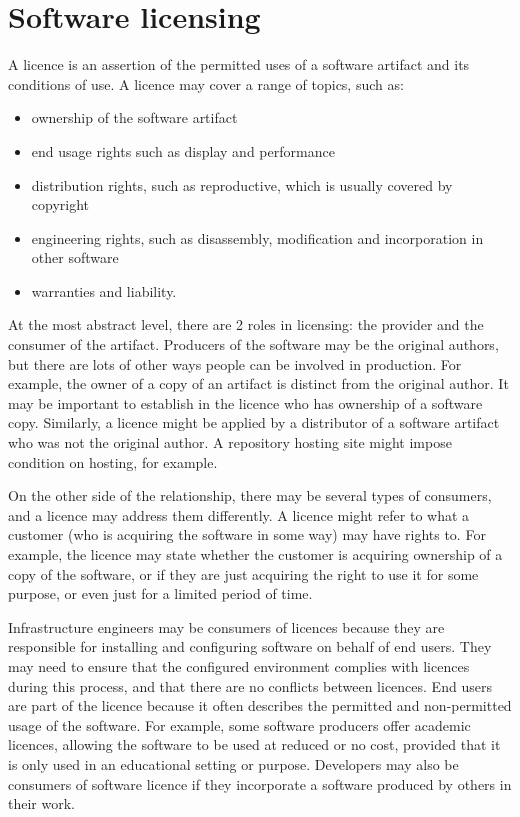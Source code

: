 \documentclass[a4paper, openany]{memoir}
\begin{document}
\chapter{Software licensing}
A licence is an assertion of the permitted uses of a software artifact and its conditions of use. A licence may cover a range of topics, such as:
\begin{itemize}
    \item ownership of the software artifact
    \item end usage rights such as display and performance
    \item distribution rights, such as reproductive, which is usually covered by copyright
    \item engineering rights, such as disassembly, modification and incorporation in other software
    \item warranties and liability.
\end{itemize}

At the most abstract level, there are 2 roles in licensing: the provider and the consumer of the artifact. Producers of the software may be the original authors, but there are lots of other ways people can be involved in production. For example, the owner of a copy of an artifact is distinct from the original author. It may be important to establish in the licence who has ownership of a software copy. Similarly, a licence might be applied by a distributor of a software artifact who was not the original author. A repository hosting site might impose condition on hosting, for example. 

On the other side of the relationship, there may be several types of consumers, and a licence may address them differently. A licence might refer to what a customer (who is acquiring the software in some way) may have rights to. For example, the licence may state whether the customer is acquiring ownership of a copy of the software, or if they are just acquiring the right to use it for some purpose, or even just for a limited period of time. 

Infrastructure engineers may be consumers of licences because they are responsible for installing and configuring software on behalf of end users. They may need to ensure that the configured environment complies with licences during this process, and that there are no conflicts between licences. End users are part of the licence because it often describes the permitted and non-permitted usage of the software. For example, some software producers offer academic licences, allowing the software to be used at reduced or no cost, provided that it is only used in an educational setting or purpose. Developers may also be consumers of software licence if they incorporate a software produced by others in their work.
\end{document}
